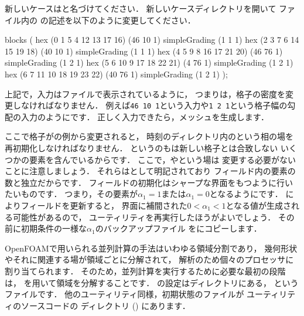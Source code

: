 新しいケースはと名づけてください．
新しいケースディレクトリを開いて
ファイル内の
の記述を以下のように変更してください．
\begin{OFverbatim}[file]
blocks
(
    hex (0 1 5 4 12 13 17 16) (46 10 1) simpleGrading (1 1 1)
    hex (2 3 7 6 14 15 19 18) (40 10 1) simpleGrading (1 1 1)
    hex (4 5 9 8 16 17 21 20) (46 76 1) simpleGrading (1 2 1)
    hex (5 6 10 9 17 18 22 21) (4 76 1) simpleGrading (1 2 1)
    hex (6 7 11 10 18 19 23 22) (40 76 1) simpleGrading (1 2 1)
);
\end{OFverbatim}
上記で，入力はファイルで表示されているように，
つまりは，格子の密度を変更しなければなりません．
例えば\texttt{46 10 1}という入力や\texttt{1 2 1}という格子幅の勾配の入力のようにです．
正しく入力できたら，メッシュを生成します．

ここで格子がの例から変更されると，
時刻のディレクトリ内のという相の場を
再初期化しなければなりません．
というのもは新しい格子とは合致しない
いくつかの要素を含んでいるからです．
ここで，やという場は
変更する必要がないことに注意しましょう．
それらはとして明記されており
フィールド内の要素の数と独立だからです．
フィールドの初期化はシャープな界面をもつように行いたいものです．
つまり，その要素が$\alpha_{1} = 1$または$\alpha_{1} = 0$となるようにです．
によりフィールドを更新すると，
界面に補間された$0 < \alpha_{1} < 1$となる値が生成される可能性があるので，
ユーティリティを再実行したほうがよいでしょう．
その前に初期条件の一様な$\alpha_{1}$のバックアップファイル
をにコピーします．

OpenFOAMで用いられる並列計算の手法はいわゆる領域分割であり，
幾何形状やそれに関連する場が領域ごとに分解されて，
解析のため個々のプロセッサに割り当てられます．
そのため，並列計算を実行するために必要な最初の段階は，
を用いて領域を分解することです．
の設定はディレクトリにある，
というファイルです．
他のユーティリティ同様，初期状態のファイルが
ユーティリティのソースコードの
ディレクトリ () にあります．

